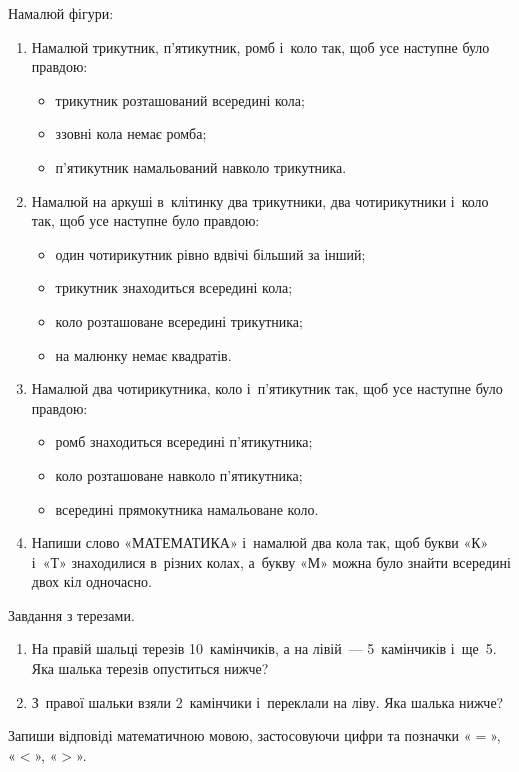 \problem
Намалюй фігури:
\begin{enumerate}
    \item Намалюй трикутник, п'ятикутник, ромб і~коло так,
    щоб усе наступне було правдою:
    \begin{itemize}
        \item трикутник розташований всередині кола;
        \item ззовні кола немає ромба;
        \item п'ятикутник намальований навколо трикутника.
    \end{itemize}
    \item Намалюй на аркуші в~клітинку два трикутники,
    два чотирикутники і~коло так, щоб усе наступне було правдою:
    \begin{itemize}
        \item один чотирикутник рівно вдвічі більший за інший;
        \item трикутник знаходиться всередині кола;
        \item коло розташоване всередині трикутника;
        \item на малюнку немає квадратів.
    \end{itemize}
    \item Намалюй два чотирикутника, коло і~п'ятикутник так,
    щоб усе наступне було правдою:
    \begin{itemize}
        \item ромб знаходиться всередині п'ятикутника;
        \item коло розташоване навколо п'ятикутника;
        \item всередині прямокутника намальоване коло.
    \end{itemize}
    \item Напиши слово «МАТЕМАТИКА» і~намалюй два кола так,
    щоб букви «К» і~«Т» знаходилися в~різних колах,
    а~букву «М» можна було знайти всередині двох кіл одночасно.
\end{enumerate}


\problem
Завдання з терезами.
\begin{enumerate}
    \item На правій шальці терезів 10~камінчиків, а на лівій~---
    5~камінчиків і~ще~5. Яка шалька терезів опуститься нижче?
    \item З~правої шальки взяли 2~камінчики і~переклали на ліву.
    Яка шалька нижче?
\end{enumerate}
Запиши відповіді математичною мовою, застосовуючи цифри
та позначки «$=$», «$<$», «$>$».


